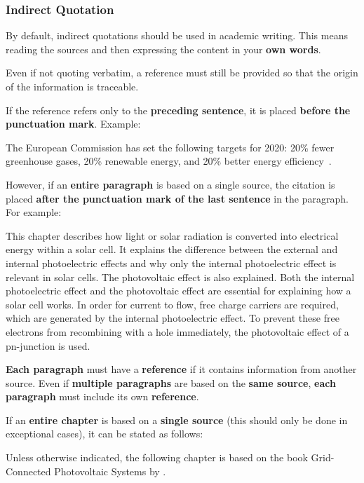 \documentclass[a4paper, fleqn, headsepline, footsepline, 12pt, parskip=half]{scrartcl}
\begin{document}
\subsubsection{Indirect Quotation}
\label{sec:indirectQuotation}

By default, indirect quotations should be used in academic writing. This means reading the sources and then expressing the content in your \textbf{own words}.

Even if not quoting verbatim, a reference must still be provided so that the origin of the information is traceable.

If the reference refers only to the \textbf{preceding sentence}, it is placed \textbf{before the punctuation mark}. Example:

The European Commission has set the following targets for 2020: 20\% fewer greenhouse gases, 20\% renewable energy, and 20\% better energy efficiency~\cite{EC2008}.

However, if an \textbf{entire paragraph} is based on a single source, the citation is placed \textbf{after the punctuation mark of the last sentence} in the paragraph. For example:

This chapter describes how light or solar radiation is converted into electrical energy within a solar cell. It explains the difference between the external and internal photoelectric effects and why only the internal photoelectric effect is relevant in solar cells. The photovoltaic effect is also explained. Both the internal photoelectric effect and the photovoltaic effect are essential for explaining how a solar cell works. In order for current to flow, free charge carriers are required, which are generated by the internal photoelectric effect. To prevent these free electrons from recombining with a hole immediately, the photovoltaic effect of a pn-junction is used.~\cite{Finke2012}

\textbf{Each paragraph} must have a \textbf{reference} if it contains information from another source. Even if \textbf{multiple paragraphs} are based on the \textbf{same source}, \textbf{each paragraph} must include its own \textbf{reference}.

If an \textbf{entire chapter} is based on a \textbf{single source} (this should only be done in exceptional cases), it can be stated as follows:

Unless otherwise indicated, the following chapter is based on the book {\glqq}Grid-Connected Photovoltaic Systems{\grqq} by \citet{Schlabbach2011}.
\end{document}
